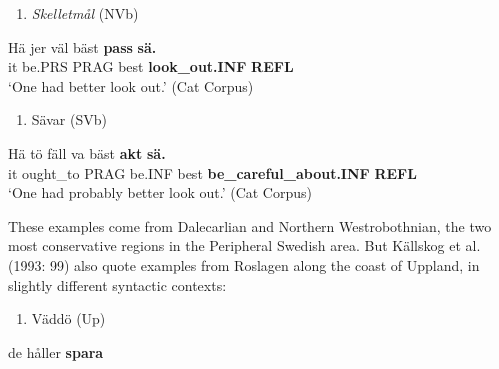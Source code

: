 \begin{enumerate} %
\item 
\textit{Skelletmål} (NVb)
\end{enumerate} %
\ea\label{}
\gll Hä  jer  väl  bäst  \textbf{pass} \textbf{sä.}\\


it  be.PRS  PRAG  best  \textbf{look\_out.INF} \textbf{REFL}\\ %


‘One had better look out.’ (Cat Corpus)
\z


\begin{enumerate} %
\item 
Sävar (SVb)

\end{enumerate} %
\ea\label{}
\gll Hä  tö  fäll  va  bäst  \textbf{akt}\textbf{  sä.}\\


it  ought\_to  PRAG  be.INF  best  \textbf{be\_careful\_about.INF} \textbf{REFL}\\ %


‘One had probably better look out.’ (Cat Corpus)
\z


These examples come from Dalecarlian and Northern Westrobothnian, the two most conservative regions in the Peripheral Swedish area. But Källskog et al. (1993: 99) also quote examples from Roslagen along the coast of Uppland, in slightly different syntactic contexts:

\begin{enumerate} %
\item 
Väddö (Up)

\end{enumerate} %
\ea\label{}
\gll de  håller  \textbf{spara}\\


